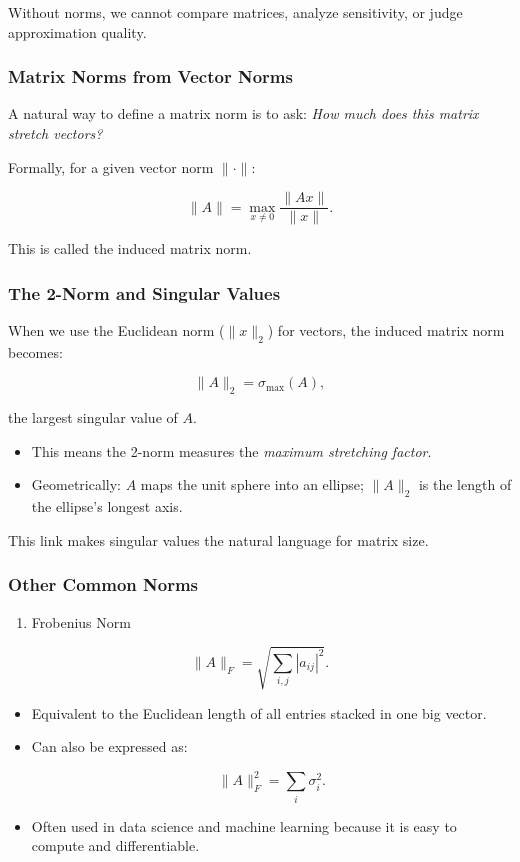 \documentclass[
  letterpaper,
  DIV=11,
  numbers=noendperiod]{scrreprt}
\providecommand{\tightlist}{%
  \setlength{\itemsep}{0pt}\setlength{\parskip}{0pt}}
\begin{document}
Without norms, we cannot compare matrices, analyze sensitivity, or judge
approximation quality.

\subsubsection{Matrix Norms from Vector
Norms}\label{matrix-norms-from-vector-norms}

A natural way to define a matrix norm is to ask: \emph{How much does
this matrix stretch vectors?}

Formally, for a given vector norm \(\|\cdot\|\):

\[
\|A\| = \max_{x \neq 0} \frac{\|Ax\|}{\|x\|}.
\]

This is called the induced matrix norm.

\subsubsection{The 2-Norm and Singular
Values}\label{the-2-norm-and-singular-values}

When we use the Euclidean norm (\(\|x\|_2\)) for vectors, the induced
matrix norm becomes:

\[
\|A\|_2 = \sigma_{\max}(A),
\]

the largest singular value of \(A\).

\begin{itemize}
\tightlist
\item
  This means the 2-norm measures the \emph{maximum stretching factor}.
\item
  Geometrically: \(A\) maps the unit sphere into an ellipse; \(\|A\|_2\)
  is the length of the ellipse's longest axis.
\end{itemize}

This link makes singular values the natural language for matrix size.

\subsubsection{Other Common Norms}\label{other-common-norms}

\begin{enumerate}
\def\labelenumi{\arabic{enumi}.}
\tightlist
\item
  Frobenius Norm
\end{enumerate}

\[
\|A\|_F = \sqrt{\sum_{i,j} |a_{ij}|^2}.
\]

\begin{itemize}
\item
  Equivalent to the Euclidean length of all entries stacked in one big
  vector.
\item
  Can also be expressed as:

  \[
  \|A\|_F^2 = \sum_i \sigma_i^2.
  \]
\item
  Often used in data science and machine learning because it is easy to
  compute and differentiable.
\end{itemize}
\end{document}
